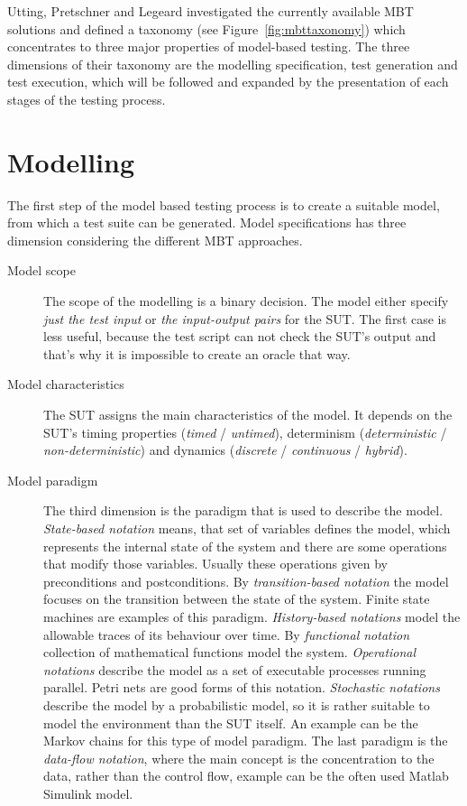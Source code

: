 Utting, Pretschner and Legeard investigated the currently available MBT solutions and defined a taxonomy (see Figure~\ref{fig:mbttaxonomy}) which concentrates to three major properties of model-based testing. The three dimensions of their taxonomy are the modelling specification, test generation and test execution, which will be followed and expanded by the presentation of each stages of the testing process.

\section{Modelling}
\label{sec:modelling}

The first step of the model based testing process is to create a suitable model, from which a test suite can be generated.  Model specifications has three dimension considering the different MBT approaches.

\begin{description}
	\item[Model scope] The scope of the modelling is a binary decision. The model either specify \textit{just the test input} or \textit{the input-output pairs} for the SUT. The first case is less useful, because the test script can not check the SUT's output and that's why it is impossible to create an oracle that way.
	
	\item[Model characteristics] The SUT assigns the main characteristics of the model. It depends on the SUT's timing properties (\textit{timed} / \textit{untimed}), determinism (\textit{deterministic} / \textit{non-deterministic}) and dynamics (\textit{discrete} / \textit{continuous} / \textit{hybrid}).
	
	\item[Model paradigm] The third dimension is the paradigm that is used to describe the model. \textit{State-based notation} means, that set of variables defines the model, which represents the internal state of the system and there are some operations that modify those variables. Usually these operations given by preconditions and postconditions. By \textit{transition-based notation} the model focuses on the transition between the state of the system. Finite state machines are examples of this paradigm. \textit{History-based notations} model the allowable traces of its behaviour over time. By \textit{functional notation} collection of mathematical functions model the system. \textit{Operational notations} describe the model as a set of executable processes running parallel. Petri nets are good forms of this notation. \textit{Stochastic notations} describe the model by a probabilistic model, so it is rather suitable to model the environment than the SUT itself. An example can be the Markov chains for this type of model paradigm. The last paradigm is the \textit{data-flow notation}, where the main concept is the concentration to the data, rather than the control flow, example can be the often used Matlab Simulink model.
\end{description}

